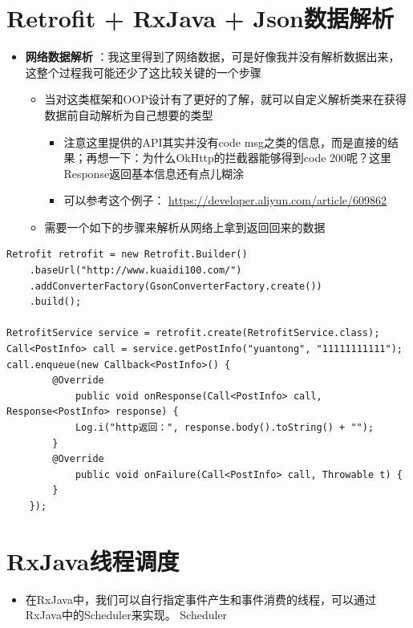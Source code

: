 \documentclass[9pt, b5paper]{article}
\begin{document}
\section{Retrofit + RxJava + Json数据解析}
\label{sec-15}
\begin{itemize}
\item \textbf{网络数据解析} ：我这里得到了网络数据，可是好像我并没有解析数据出来，这整个过程我可能还少了这比较关键的一个步骤
\begin{itemize}
\item 当对这类框架和OOP设计有了更好的了解，就可以自定义解析类来在获得数据前自动解析为自己想要的类型
\begin{itemize}
\item 注意这里提供的API其实并没有code msg之类的信息，而是直接的结果；再想一下：为什么OkHttp的拦截器能够得到code 200呢？这里Response返回基本信息还有点儿糊涂
\item 可以参考这个例子： \url{https://developer.aliyun.com/article/609862}
\end{itemize}
\item 需要一个如下的步骤来解析从网络上拿到返回回来的数据
\end{itemize}
\end{itemize}
\begin{verbatim}
Retrofit retrofit = new Retrofit.Builder()
    .baseUrl("http://www.kuaidi100.com/")
    .addConverterFactory(GsonConverterFactory.create())
    .build();
        
RetrofitService service = retrofit.create(RetrofitService.class);
Call<PostInfo> call = service.getPostInfo("yuantong", "11111111111");
call.enqueue(new Callback<PostInfo>() {
        @Override
            public void onResponse(Call<PostInfo> call, Response<PostInfo> response) {
            Log.i("http返回：", response.body().toString() + "");
        }
        @Override
            public void onFailure(Call<PostInfo> call, Throwable t) {
        }
    });
\end{verbatim}

\section{RxJava线程调度}
\label{sec-16}
\begin{itemize}
\item 在RxJava中，我们可以自行指定事件产生和事件消费的线程，可以通过RxJava中的Scheduler来实现。 Scheduler
\end{itemize}
\end{document}
